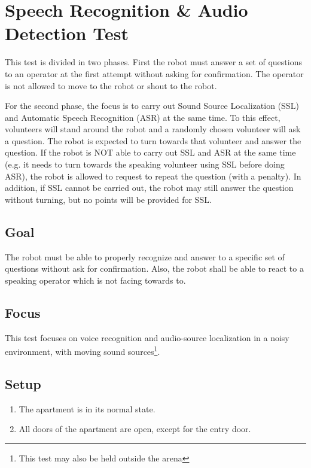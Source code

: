 \section{Speech Recognition \& Audio Detection Test}

This test is divided in two phases. First the robot must answer a set of questions to an operator at the first attempt without asking for confirmation. The operator is not allowed to move to the robot or shout to the robot.

For the second phase, the focus is to carry out Sound Source Localization (SSL) and Automatic Speech Recognition (ASR) at the same time. To this effect, volunteers will stand around the robot and a randomly chosen volunteer will ask a question. The robot is expected to turn towards that volunteer and answer the question. If the robot is NOT able to carry out SSL and ASR at the same time (e.g. it needs to turn towards the speaking volunteer using SSL before doing ASR), the robot is allowed to request to repeat the question (with a penalty). In addition, if SSL cannot be carried out, the robot may still answer the question without turning, but no points will be provided for SSL.

\subsection{Goal}
The robot must be able to properly recognize and answer to a specific set of questions without ask for confirmation. Also, the robot shall be able to react to a speaking operator which is not facing towards to.

\subsection{Focus}

This test focuses on voice recognition and audio-source localization in a noisy environment, with moving sound sources\footnote{This test may also be held outside the arena}.

\subsection{Setup}
\begin{enumerate}
\item The apartment is in its normal state.
\item All doors of the apartment are open, except for the entry door. 
\end{enumerate}

